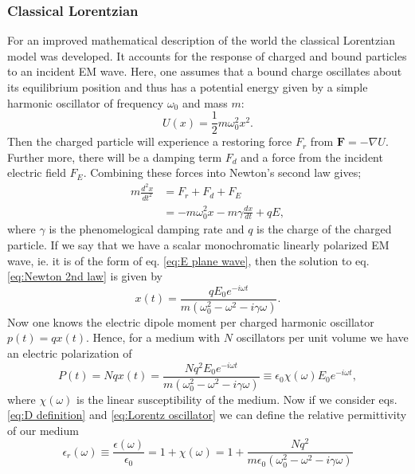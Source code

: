 \subsubsection{Classical Lorentzian}
\label{sec2:Classical Lorentzian}
For an improved mathematical description of the world the classical Lorentzian model was developed. It accounts for the response of charged and bound particles to an incident EM wave. Here, one assumes that a bound charge oscillates about its equilibrium position and thus has a potential energy given by a simple harmonic oscillator of frequency $\omega_0$ and mass $m$:
\begin{equation}
U(x)=\frac{1}{2}m \omega_0^2 x^2.
\label{eq:harmonic potential}
\end{equation}
Then the charged particle will experience a restoring force $F_r$ from $\mathbf{F}=-\nabla U$. Further more, there will be a damping term $F_d$ and a force from the incident electric field $F_E$. Combining these forces into Newton's second law gives;
\begin{equation}
\begin{split}
m\frac{d^2 x}{dt^2}&=F_r+F_d+F_E
\\ &=-m\omega_0^2x-m\gamma\frac{dx}{dt}+qE,
\label{eq:Newton 2nd law}
\end{split}
\end{equation}
where $\gamma$ is the phenomelogical damping rate and $q$ is the charge of the charged particle. If we say that we have a scalar monochromatic linearly polarized EM wave, ie. it is of the form of eq. \eqref{eq:E plane wave}, then the solution to eq. \eqref{eq:Newton 2nd law} is given by
\begin{equation}
x(t)=\frac{q E_0 e^{-i\omega t}}{m(\omega_0^2-\omega^2-i\gamma\omega)}.
\label{eq:linear harmonic oscillation}
\end{equation}
Now one knows the electric dipole moment per charged harmonic oscillator $p(t)=qx(t)$. Hence, for a medium with $N$ oscillators per unit volume we have an electric polarization of
\begin{equation}
P(t)=Nqx(t)=\frac{Nq^2 E_0 e^{-i\omega t}}{m(\omega_0^2-\omega^2-i\gamma\omega)}\equiv \epsilon_0 \chi(\omega)E_0 e^{-i\omega t},
\label{eq:Lorentz oscillator}
\end{equation}
where $\chi(\omega)$ is the linear susceptibility of the medium. Now if we consider eqs. \eqref{eq:D definition} and \eqref{eq:Lorentz oscillator} we can define the relative permittivity of our medium
\begin{equation}
\epsilon_r (\omega) \equiv \frac{\epsilon(\omega)}{\epsilon_0} =1 + \chi(\omega)=1 + \frac{Nq^2 }{m\epsilon_0(\omega_0^2-\omega^2-i\gamma\omega)}
\label{eq:relative permittivity}
\end{equation}
